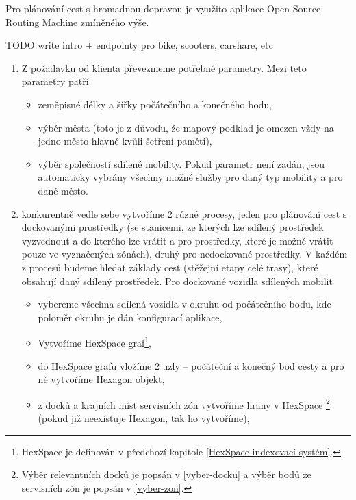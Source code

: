 \documentclass[thesis=M,czech]{FITthesis}[2019/12/23]
\theoremstyle{plain}
\theoremstyle{definition}
\begin{document}
Pro plánování cest s hromadnou dopravou je využito aplikace Open Source Routing Machine zmíněného výše.

TODO write intro + endpointy pro bike, scooters, carshare, etc



\begin{enumerate}
	\item Z požadavku od klienta převezmeme potřebné parametry. Mezi teto parametry patří
	\begin{itemize}
		\item zeměpisné délky a šířky počátečního a konečného bodu,
		\item výběr města (toto je z důvodu, že mapový podklad je omezen vždy na jedno město hlavně kvůli šetření paměti),
		\item výběr společností sdílené mobility. Pokud parametr není zadán, jsou automaticky vybrány všechny možné služby pro daný typ mobility a pro dané město.
	\end{itemize}
	\item konkurentně vedle sebe vytvoříme 2 různé procesy, jeden pro plánování cest s dockovanými prostředky (se stanicemi, ze kterých lze sdílený prostředek vyzvednout a do kterého lze vrátit a pro prostředky, které je možné vrátit pouze ve vyznačených zónách), druhý pro nedockované prostředky. V každém z procesů budeme hledat základy cest (stěžejní etapy celé trasy), které obsahují daný sdílený prostředek. Pro dockované vozidla sdílených mobilit
	\begin{itemize}
		\item vybereme všechna sdílená vozidla v okruhu od počátečního bodu, kde poloměr okruhu je dán konfigurací aplikace,
		\item Vytvoříme HexSpace graf\footnote{HexSpace je definován v předchozí kapitole \ref{HexSpace indexovací systém}.},
		\item do HexSpace grafu vložíme 2 uzly -- počáteční a konečný bod cesty a pro ně vytvoříme Hexagon objekt,
		\item z docků a krajních míst servisních zón vytvoříme hrany v HexSpace \footnote{ Výběr relevantních docků je popsán v \ref{vyber-docku}  a výběr bodů ze servisních zón je popsán v \ref{vyber-zon}.} (pokud již neexistuje Hexagon, tak ho vytvoříme), 

\end{itemize}
\end{enumerate}
\end{document}
